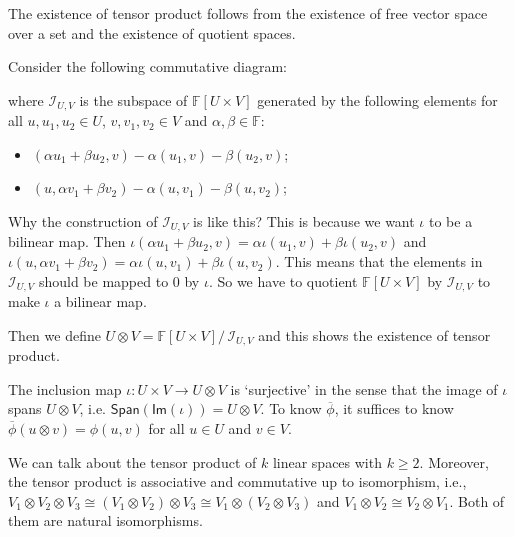\documentclass[
	11pt, %
	fleqn, %
	a4paper, %
]{LegrandOrangeBook}
\renewcommand{\Im}[1]{\mathsf{Im}(#1)} %
\renewcommand{\span}[1]{\mathsf{Span}(#1)} %
\renewcommand{\bar}[1]{\overline{#1}} %
\newcommand{\quotient}[2]{#1/\, #2} %
\newcommand{\F}{\mathbb{F}} %
\newcommand{\ideal}{\mathcal{I}} %
\begin{document}
The existence of tensor product follows from the existence of free vector space over a set and the existence of quotient spaces. 

Consider the following commutative diagram:
\begin{center}
\end{center}
where $\ideal_{U, V}$ is the subspace of $\F[U \times V]$ generated by the following elements for all $u, u_1, u_2 \in U$, $v, v_1, v_2 \in V$ and $\alpha, \beta \in \F$:
\begin{itemize}
    \item $(\alpha u_1 + \beta u_2, v) - \alpha (u_1, v) - \beta (u_2, v)$;
    \item $(u, \alpha v_1 + \beta v_2) - \alpha (u, v_1) - \beta (u, v_2)$;
\end{itemize}
Why the construction of $\ideal_{U, V}$ is like this? This is because we want $\iota$ to be a bilinear map. Then $\iota(\alpha u_1 + \beta u_2, v) = \alpha \iota(u_1, v) + \beta \iota(u_2, v)$ and $\iota(u, \alpha v_1 + \beta v_2) = \alpha \iota(u, v_1) + \beta \iota(u, v_2)$. This means that the elements in $\ideal_{U, V}$ should be mapped to $0$ by $\iota$. So we have to quotient $\F[U \times V]$ by $\ideal_{U, V}$ to make $\iota$ a bilinear map.

Then we define $U \otimes V = \quotient{\F[U \times V]}{\ideal_{U, V}}$ and this shows the existence of tensor product.
\begin{remark}
    The inclusion map $\iota : U \times V \to U \otimes V$ is `surjective' in the sense that the image of $\iota$ spans $U \otimes V$, i.e. $\span{\Im{\iota}} = U \otimes V$. To know $\bar{\phi}$, it suffices to know $\bar{\phi}(u \otimes v) = \phi(u, v)$ for all $u \in U$ and $v \in V$.
\end{remark}

We can talk about the tensor product of $k$ linear spaces with $k \geq 2$. Moreover, the tensor product is associative and commutative up to isomorphism, i.e., $V_1 \otimes V_2 \otimes V_3 \cong (V_1 \otimes V_2) \otimes V_3 \cong V_1 \otimes (V_2 \otimes V_3)$ and $V_1 \otimes V_2 \cong V_2 \otimes V_1$. Both of them are natural isomorphisms.
\end{document}
